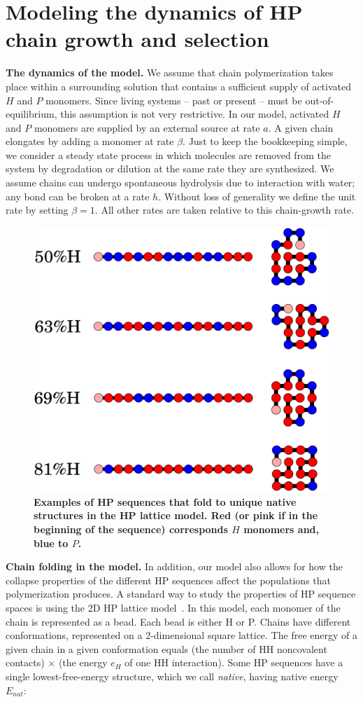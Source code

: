 \documentclass[journal=jacsat,manuscript=article,layout=twocolumn]{achemso}
\begin{document}
\section{Modeling the dynamics of HP chain growth and selection}
 
 \textbf{The dynamics of the model.}  We assume that chain polymerization takes place within a 
surrounding solution that contains a sufficient supply of activated $H$ and $P$ monomers.  Since 
living systems -- past or present -- must be out-of-equilibrium, this 
assumption is not very restrictive.  In our model, activated $H$ and $P$ monomers are supplied by 
an external source at rate $a$.  A given chain elongates by adding a monomer at rate $\beta$.  Just 
to keep the bookkeeping simple, we consider a steady state process in which molecules are removed 
from the system by degradation or dilution at the same rate they are 
synthesized.  We assume chains can undergo spontaneous hydrolysis due to interaction with water; 
any bond can be broken at a rate $h$. Without loss of generality we define the unit rate by 
setting 
$\beta = 1$.  All other rates are taken relative to this chain-growth rate.
 
 \begin{figure}[ht!]
  \centering
  \includegraphics[width=0.8\columnwidth]{pictures/tst-seqs.pdf} 
  \caption{\footnotesize{\bf{Examples of HP sequences that fold to unique native structures in the 
HP lattice model.} Red (or pink if in the beginning of the sequence) corresponds $H$ monomers and, 
blue to $P$.}}
  \label{fig:hydro-effect}
\end{figure}
 \textbf{Chain folding in the model.}  In addition, our model also allows for how the collapse 
properties of the different HP sequences affect the populations that polymerization produces.  A 
standard way to study the properties of HP sequence spaces is using the 2D HP lattice 
model~\cite{lau1989lattice,Chan1991}.  In this model, each monomer of the chain is represented as 
a 
bead.  Each bead is either H or P.  Chains have different conformations, represented on a 
2-dimensional square lattice.  The free energy of a given chain in a given conformation equals 
(the 
number of HH noncovalent contacts) $\times$ (the energy $e_H$ of one HH interaction).  Some HP 
sequences have a single lowest-free-energy structure, which we call \emph{native}, having native 
energy $E_{nat}$:
\end{document}
